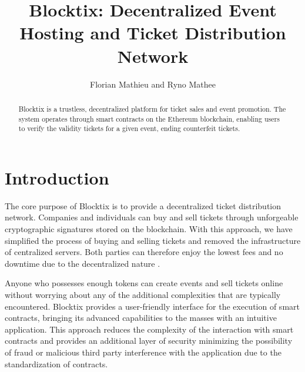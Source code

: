 \documentclass[a4paper]{article}
\title{Blocktix: Decentralized Event Hosting and Ticket Distribution Network}
\author{Florian Mathieu and Ryno Mathee}
\begin{document}
\maketitle

\begin{abstract}
Blocktix is a trustless, decentralized platform for ticket sales and event promotion. The system operates through smart contracts on the Ethereum blockchain, enabling users to verify the validity tickets for a given event, ending counterfeit tickets.

\end{abstract}

\section{Introduction}

The core purpose of Blocktix is to provide a decentralized ticket distribution network. Companies and individuals can buy and sell tickets through unforgeable cryptographic signatures stored on the blockchain. With this approach, we have simplified the process of buying and selling tickets and removed the infrastructure of centralized servers. Both parties can therefore enjoy the lowest fees and no downtime due to the decentralized nature .\par
\vspace{5mm}
\noindent Anyone who possesses enough tokens can create events and sell tickets online without worrying about any of the additional complexities that are typically encountered. Blocktix provides a user-friendly interface for the execution of smart contracts, bringing its advanced capabilities to the masses with an intuitive application. This approach reduces the complexity of the interaction with smart contracts and provides an additional layer of security minimizing the possibility of fraud or malicious third party interference with the application due to the standardization of contracts.
\end{document}

